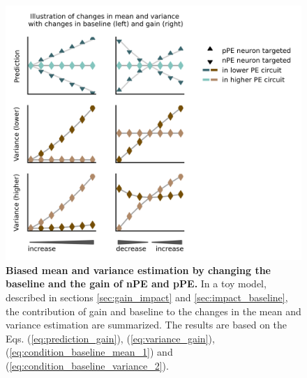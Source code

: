 \documentclass[10pt,a4paper]{article}
\begin{document}
\begin{figure}[!h]
	\centering
    \includegraphics{../results/figures/final/Fig_4_S3}%
\caption{\footnotesize{\bf Biased mean and variance estimation by changing the baseline and the gain of nPE and pPE.}
In a toy model, described in sections \ref{sec:gain_impact} and \ref{sec:impact_baseline}, the contribution of gain and baseline to the changes in the mean and variance estimation are summarized. The results are based on the Eqs. (\ref{eq:prediction_gain}), (\ref{eq:variance_gain}), (\ref{eq:condition_baseline_mean_1}) and  (\ref{eq:condition_baseline_variance_2}).
}
\label{fig:Fig_4_S3}
\end{figure}
\end{document}
